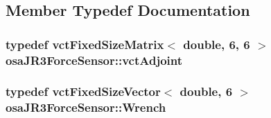 \subsection{Member Typedef Documentation}
\hypertarget{classosa_j_r3_force_sensor_af769666ad69e4db31c2891ddf67d2abd}{
\subsubsection[{vct\-Adjoint}]{\setlength{\rightskip}{0pt plus 5cm}typedef {\bf vct\-Fixed\-Size\-Matrix}$<$ double, 6, 6 $>$ {\bf osa\-J\-R3\-Force\-Sensor\-::vct\-Adjoint}}}\label{classosa_j_r3_force_sensor_af769666ad69e4db31c2891ddf67d2abd}
\hypertarget{classosa_j_r3_force_sensor_afcfc2ba175b2e7ef9f86c6394c8966d2}{
\subsubsection[{Wrench}]{\setlength{\rightskip}{0pt plus 5cm}typedef {\bf vct\-Fixed\-Size\-Vector}$<$ double, 6 $>$ {\bf osa\-J\-R3\-Force\-Sensor\-::\-Wrench}}}\label{classosa_j_r3_force_sensor_afcfc2ba175b2e7ef9f86c6394c8966d2}


